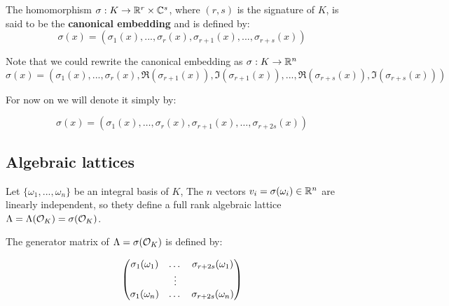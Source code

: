 \documentclass[Ingles]{ic-tese-v3}
\begin{document}
   \begin{definition}\label{def:canonical-embedding}
The homomorphism $\sigma: K \rightarrow \mathbb{R}^r \times \mathbb{C}^s$, where $(r,s)$ is the signature of $K$, is
said to be the \textbf{canonical embedding} and is defined by:
$$
\sigma(x) = \left(\sigma_1(x), ... , \sigma_r(x), \sigma_{r+1}(x), ..., \sigma_{r+s}(x) \right)
$$

Note that we could rewrite the canonical embedding as $\sigma : K \rightarrow \mathbb{R}^n$
$$
\sigma(x) = \left( \sigma_1(x), ... , \sigma_r(x), \Re(\sigma_{r+1}(x)), \Im(\sigma_{r+1}(x)), ...,
  \Re(\sigma_{r+s}(x)), \Im(\sigma_{r+s}(x)) \right)
$$

For now on we will denote it simply by:

$$
\sigma(x) = \left( \sigma_1(x), \dots , \sigma_r(x), \sigma_{r+1}(x), \dots, \sigma_{r+2s}(x) \right)
$$

\end{definition}

\subsection{Algebraic lattices}
\label{sec:orgee3e644}

\begin{theorem}[]\label{theo:algebraic-lattice}
Let $\{\omega_1,...,\omega_n\}$ be an integral basis of $K$, The $n$ vectors $v_i = \sigma(\omega_i)
\in \mathbb{R}^n$ are linearly independent, so thety define a full rank algebraic lattice
$\Lambda = \Lambda(\mathcal{O}_K) = \sigma(\mathcal{O}_K)$.
\end{theorem} 
The generator matrix of \(\Lambda = \sigma(\mathcal{O}_K)\) is defined by:

\begin{equation}
  \label{def:gen-matrix-alg-lattices}
  \begin{pmatrix}
    \sigma_1(\omega_1) & $\dots$ &  \sigma_{r+2s}(\omega_1) \\
    & \vdots & \\
    \sigma_1(\omega_n) & $\dots$ & \sigma_{r+2s}(\omega_n) \\
  \end{pmatrix}  
\end{equation}
\end{document}
